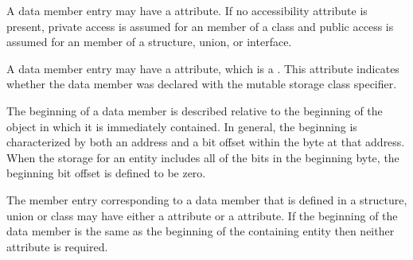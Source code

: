 A data member entry may have a
\hyperlink{chap:DWATaccessibilityattribute}{\DWATaccessibilityNAME}
attribute.
If no accessibility attribute is present, private
access is assumed for an member of a class and public access
is assumed for an member of a structure, union, or interface.

A\hypertarget{chap:DWATmutablemutablepropertyofmemberdata}{}
data member entry 
may have a
\DWATmutableDEFN{} attribute,
which is a .
This attribute indicates whether the data
member was declared with the mutable storage class specifier.

The beginning of a data member
is described relative to
the beginning of the object in which it is immediately
contained. In general, the beginning is characterized by
both an address and a bit offset within the byte at that
address. When the storage for an entity includes all of
the bits in the beginning byte, the beginning bit offset is
defined to be zero.

The\hypertarget{chap:DWATdatabitoffsetdatamemberbitlocation}{}
member\hypertarget{chap:DWATdatamemberlocationdatamemberlocation}{}
entry 
corresponding to a data member that is defined
in a structure, union or class may have either a
\DWATdatamemberlocationDEFN{} attribute
or a \DWATdatabitoffsetDEFN{} attribute.
If the beginning of the data member is the same as
the beginning of the containing entity then neither attribute
is required.

